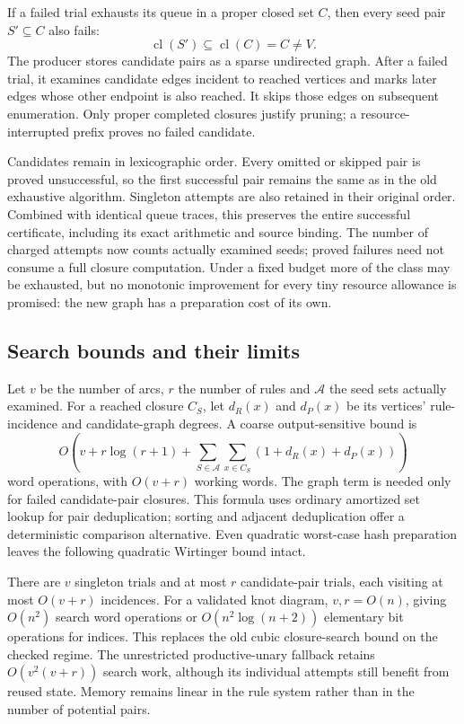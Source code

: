 If a failed trial exhausts its queue in a proper closed set $C$, then every
seed pair $S'\subseteq C$ also fails:
\[
 \operatorname{cl}(S')\subseteq\operatorname{cl}(C)=C\ne V.
\]
The producer stores candidate pairs as a sparse undirected graph. After a
failed trial, it examines candidate edges incident to reached vertices and
marks later edges whose other endpoint is also reached. It skips those edges
on subsequent enumeration. Only proper completed closures justify pruning;
a resource-interrupted prefix proves no failed candidate.

Candidates remain in lexicographic order. Every omitted or skipped pair is
proved unsuccessful, so the first successful pair remains the same as in the
old exhaustive algorithm. Singleton attempts are also retained in their
original order. Combined with identical queue traces, this preserves the
entire successful certificate, including its exact arithmetic and source
binding. The number of charged attempts now counts actually examined seeds;
proved failures need not consume a full closure computation. Under a fixed
budget more of the class may be exhausted, but no monotonic improvement for
every tiny resource allowance is promised: the new graph has a preparation
cost of its own.

\subsection{Search bounds and their limits}

Let $v$ be the number of arcs, $r$ the number of rules and $\mathcal A$ the
seed sets actually examined. For a reached closure $C_S$, let $d_R(x)$ and
$d_P(x)$ be its vertices' rule-incidence and candidate-graph degrees.
A coarse output-sensitive bound is
\[
 O\!\left(v+r\log(r+1)+
 \sum_{S\in\mathcal A}\sum_{x\in C_S}
 (1+d_R(x)+d_P(x))\right)
\]
word operations, with $O(v+r)$ working words. The graph term is needed only
for failed candidate-pair closures. This formula uses ordinary amortized
set lookup for pair deduplication; sorting and adjacent deduplication offer
a deterministic comparison alternative. Even quadratic worst-case hash
preparation leaves the following quadratic Wirtinger bound intact.

There are $v$ singleton trials and at most $r$ candidate-pair trials, each
visiting at most $O(v+r)$ incidences. For a validated knot diagram,
$v,r=O(n)$, giving $O(n^2)$ search word operations or
$O(n^2\log(n+2))$ elementary bit operations for indices. This replaces the
old cubic closure-search bound on the checked regime. The unrestricted
productive-unary fallback retains $O(v^2(v+r))$ search work, although its
individual attempts still benefit from reused state. Memory remains linear
in the rule system rather than in the number of potential pairs.

